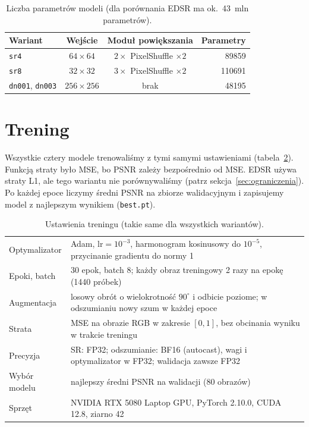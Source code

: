 \documentclass[11pt,a4paper]{article}
\newcommand{\code}[1]{\texttt{\mdseries #1}}
\begin{document}
\begin{table}[H]
  \centering\small
  \caption{Liczba parametrów modeli (dla porównania EDSR ma ok.\ 43~mln parametrów).}
  \label{tab:parametry}
  \begin{tabular}{@{}lccr@{}}
    \toprule
    Wariant & Wejście & Moduł powiększania & Parametry \\
    \midrule
    \code{sr4}            & $64\times64$   & $2\times$ PixelShuffle $\times2$ & \num{89859} \\
    \code{sr8}            & $32\times32$   & $3\times$ PixelShuffle $\times2$ & \num{110691} \\
    \code{dn001}, \code{dn003} & $256\times256$ & brak & \num{48195} \\
    \bottomrule
  \end{tabular}
\end{table}

\section{Trening}\label{sec:trening}

Wszystkie cztery modele trenowaliśmy z tymi samymi ustawieniami (tabela~\ref{tab:trening}).
Funkcją straty było MSE, bo PSNR zależy bezpośrednio od MSE. EDSR używa straty L1, ale tego wariantu
nie porównywaliśmy (patrz sekcja~\ref{sec:ograniczenia}). Po każdej epoce liczymy średni PSNR na
zbiorze walidacyjnym i zapisujemy model z najlepszym wynikiem (\code{best.pt}).

\begin{table}[H]
  \centering\small
  \caption{Ustawienia treningu (takie same dla wszystkich wariantów).}
  \label{tab:trening}
  \begin{tabularx}{\textwidth}{@{}lX@{}}
    \toprule
    Optymalizator & Adam, $\text{lr}=10^{-3}$, harmonogram kosinusowy do $10^{-5}$, przycinanie gradientu do normy 1 \\
    Epoki, batch & 30 epok, batch 8; każdy obraz treningowy 2 razy na epokę (1440 próbek) \\
    Augmentacja & losowy obrót o wielokrotność $90^\circ$ i odbicie poziome; w odszumianiu nowy szum w każdej epoce \\
    Strata & MSE na obrazie RGB w zakresie $[0,1]$, bez obcinania wyniku w trakcie treningu \\
    Precyzja & SR: FP32; odszumianie: BF16 (autocast), wagi i optymalizator w FP32; walidacja zawsze FP32 \\
    Wybór modelu & najlepszy średni PSNR na walidacji (80 obrazów) \\
    Sprzęt & NVIDIA RTX 5080 Laptop GPU, PyTorch 2.10.0, CUDA 12.8, ziarno 42 \\
    \bottomrule
  \end{tabularx}
\end{table}
\end{document}
